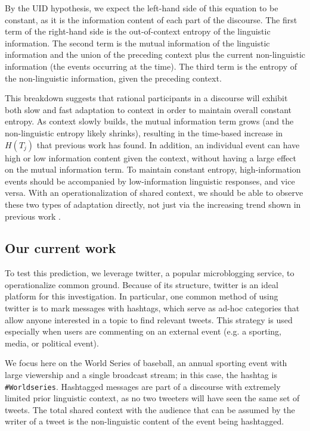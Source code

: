 \documentclass[11pt,letterpaper]{article}
\begin{document}
By the UID hypothesis, we expect the left-hand side of this equation to be constant, as it is the information content of each part of the discourse.  The first term of the right-hand side is the out-of-context entropy of the linguistic information. The second term is the mutual information of the linguistic information and the union of the preceding context plus the current non-linguistic information (the events occurring at the time).  The third term is the entropy of the non-linguistic information, given the preceding context.

This breakdown suggests that rational participants in a discourse will exhibit both slow and fast adaptation to context in order to maintain overall constant entropy.  As context slowly builds, the mutual information term grows (and the non-linguistic entropy likely shrinks), resulting in the time-based increase in $H(T_j)$ that previous work has found.  In addition, an individual event can have high or low information content given the context, without having a large effect on the mutual information term.  To maintain constant entropy, high-information events should be accompanied by low-information linguistic responses, and vice versa.  With an operationalization of shared context, we should be able to observe these two types of adaptation directly, not just via the increasing trend shown in previous work \cite{genzel2002,qian2012}.  

\subsection{Our current work}

To test this prediction, we leverage twitter, a popular microblogging service, to operationalize common ground. Because of its structure, twitter is an ideal platform for this investigation. In particular, one common method of using twitter is to mark messages with hashtags, which serve as ad-hoc categories that allow anyone interested in a topic to find relevant tweets. This strategy is used especially when users are commenting on an external event (e.g. a sporting, media, or political event). 

We focus here on the World Series of baseball, an annual sporting event with large viewership and a single broadcast stream; in this case, the hashtag is \texttt{\#Worldseries}. Hashtagged messages are part of a discourse with extremely limited prior linguistic context, as no two tweeters will have seen the same set of tweets. The total shared context with the audience that can be assumed by the writer of a tweet is the non-linguistic content of the event being hashtagged. 
\end{document}
